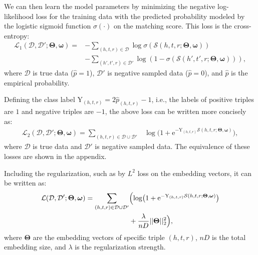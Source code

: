 \documentclass[sigconf,edbt]{acmart-edbt2019}
\def\gD{{\mathcal{D}}}
\def\gL{{\mathcal{L}}}
\def\gS{{\mathcal{S}}}
\begin{document}
We can then learn the model parameters by minimizing the negative log-likelihood loss for the training data with the predicted probability modeled by the logistic sigmoid function $ \sigma (\cdot) $ on the matching score. This loss is the cross-entropy:
\begin{equation} \label{eq:loss_crossentropy} \begin{split}
\gL_1(\gD, \gD';\bm{\Theta}, \bm{\omega}) = &- \sum_{(h, t, r) \in \gD}{\log \sigma \left( \gS \left( h,t,r;\bm{\Theta}, \bm{\omega} \right) \right)} \\
& - \sum_{(h', t', r) \in \gD'}{\log \left( 1 - \sigma \left( \gS \left( h',t',r;\bm{\Theta}, \bm{\omega} \right) \right) \right)},
\end{split}
\end{equation}
where $ \gD $ is true data ($ \hat{p} = 1 $), $ \gD' $ is negative sampled data ($ \hat{p} = 0 $), and $ \hat{p} $ is the empirical probability.

Defining the class label $ \text{Y}_{(h,t,r)} = 2 \hat{p}_{(h,t,r)} - 1 $, i.e., the labels of positive triples are $ 1 $ and negative triples are $ -1 $, the above loss can be written more concisely as:
\begin{equation} \label{eq:loss_softplus} \begin{split}
\gL_2(\gD, \gD';\bm{\Theta}, \bm{\omega}) = \sum_{(h, t, r) \in \gD \cup \gD'}&\log \bigl( 1 + \text{e}^{- \text{Y}_{(h,t,r)} \gS (h,t,r;\bm{\Theta}, \bm{\omega})} \bigr),
\end{split}
\end{equation}
where $ \gD $ is true data and $ \gD' $ is negative sampled data. The equivalence of these losses are shown in the appendix.

Including the regularization, such as by $ L^2 $ loss on the embedding vectors, it can be written as:
\begin{equation} \label{eq:loss_softplus_reg}
	\begin{split}
		\gL(\gD, \gD';\bm{\Theta}, \bm{\omega}) = \sum_{(h, t, r) \in \gD \cup \gD'}&\Bigl(\log \bigl( 1 + \text{e}^{- \text{Y}_{(h,t,r)} \gS (h,t,r;\bm{\Theta}, \bm{\omega})} \bigr) \\
		&+ \frac{\lambda}{n D} ||\bm{\Theta}||_2^2 \Bigr),
	\end{split}
\end{equation}
where $ \bm{\Theta} $ are the embedding vectors of specific triple $ (h, t, r) $, $ n D $ is the total embedding size, and $ \lambda $ is the regularization strength.
\end{document}
